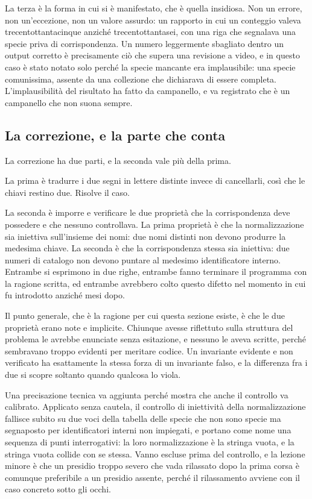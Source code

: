 La terza è la forma in cui si è manifestato, che è quella insidiosa. Non un errore, non un'eccezione, non un valore assurdo: un rapporto in cui un conteggio valeva trecentottantacinque anziché trecentottantasei, con una riga che segnalava una specie priva di corrispondenza. Un numero leggermente sbagliato dentro un output corretto è precisamente ciò che supera una revisione a video, e in questo caso è stato notato solo perché la specie mancante era implausibile: una specie comunissima, assente da una collezione che dichiarava di essere completa. L'implausibilità del risultato ha fatto da campanello, e va registrato che è un campanello che non suona sempre.

\subsection*{La correzione, e la parte che conta}

La correzione ha due parti, e la seconda vale più della prima.

La prima è tradurre i due segni in lettere distinte invece di cancellarli, così che le chiavi restino due. Risolve il caso.

La seconda è imporre e verificare le due proprietà che la corrispondenza deve possedere e che nessuno controllava. La prima proprietà è che la normalizzazione sia iniettiva sull'insieme dei nomi: due nomi distinti non devono produrre la medesima chiave. La seconda è che la corrispondenza stessa sia iniettiva: due numeri di catalogo non devono puntare al medesimo identificatore interno. Entrambe si esprimono in due righe, entrambe fanno terminare il programma con la ragione scritta, ed entrambe avrebbero colto questo difetto nel momento in cui fu introdotto anziché mesi dopo.

Il punto generale, che è la ragione per cui questa sezione esiste, è che le due proprietà erano note e implicite. Chiunque avesse riflettuto sulla struttura del problema le avrebbe enunciate senza esitazione, e nessuno le aveva scritte, perché sembravano troppo evidenti per meritare codice. Un invariante evidente e non verificato ha esattamente la stessa forza di un invariante falso, e la differenza fra i due si scopre soltanto quando qualcosa lo viola.

Una precisazione tecnica va aggiunta perché mostra che anche il controllo va calibrato. Applicato senza cautela, il controllo di iniettività della normalizzazione fallisce subito su due voci della tabella delle specie che non sono specie ma segnaposto per identificatori interni non impiegati, e portano come nome una sequenza di punti interrogativi: la loro normalizzazione è la stringa vuota, e la stringa vuota collide con se stessa. Vanno escluse prima del controllo, e la lezione minore è che un presidio troppo severo che vada rilassato dopo la prima corsa è comunque preferibile a un presidio assente, perché il rilassamento avviene con il caso concreto sotto gli occhi.

